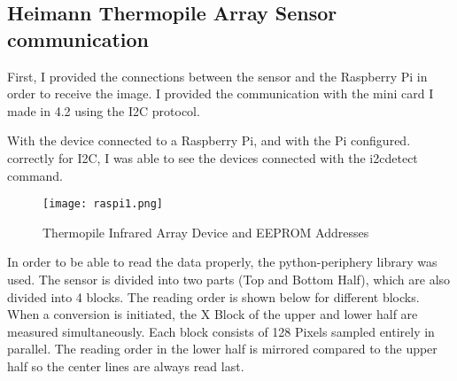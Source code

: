 \documentclass[thesis]{deutez}
\begin{document}
\subsection{Heimann Thermopile Array Sensor communication}
First, I provided the connections between the sensor and the Raspberry Pi in order to receive the image. I provided the communication with the mini card I made in 4.2 using the I2C protocol.

With the device connected to a Raspberry Pi, and with the Pi configured.\cite{adaf} correctly for I2C, I was able to see the devices connected with the i2cdetect command.
\begin{figure}[h!]
	\centering
	\texttt{[image: raspi1.png]}
	\caption{Thermopile Infrared Array Device and EEPROM Addresses}
\end{figure}
\FloatBarrier

In order to be able to read the data properly, the python-periphery\cite{perip} library was used. The sensor is divided into two parts (Top and Bottom Half), which are also divided into 4 blocks. The reading order is shown below for different blocks. When a conversion is initiated, the X Block of the upper and lower half are measured simultaneously. Each block consists of 128 Pixels sampled entirely in parallel. The reading order in the lower half is mirrored compared to the upper half so the center lines are always read last.
\end{document}
